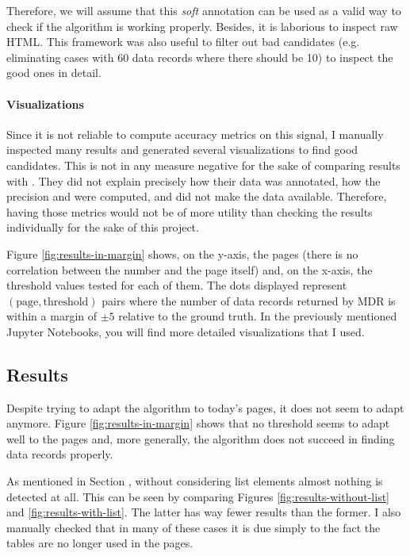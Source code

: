 \documentclass[10pt]{article}
\begin{document}
Therefore, we will assume that this \emph{soft} annotation can be used as a valid way to check if the algorithm is working properly. Besides, it is laborious to inspect raw HTML. This framework was also useful to filter out bad candidates (e.g. eliminating cases with 60 data records where there should be 10) to inspect the good ones in detail.


\paragraph{Visualizations} 

Since it is not reliable to compute accuracy metrics on this signal, I manually inspected many results and generated several visualizations to find good candidates. This is not in any measure negative for the sake of comparing results with \cite{mdr}. They did not explain precisely how their data was annotated, how the precision and were computed, and did not make the data available. Therefore, having those metrics would not be of more utility than checking the results individually for the sake of this project. 

Figure \ref{fig:results-in-margin} shows, on the y-axis, the pages (there is no correlation between the number and the page itself) and, on the x-axis, the threshold values tested for each of them. The dots displayed represent $(\text{page}, \text{threshold})$ pairs where the number of data records returned by MDR is within a margin of $\pm 5$ relative to the ground truth. In the previously mentioned Jupyter Notebooks, you will find more detailed visualizations that I used.



\subsection{Results} \label{txt:results}

Despite trying to adapt the algorithm to today's pages, it does not seem to adapt anymore. Figure \ref{fig:results-in-margin} shows that no threshold seems to adapt well to the pages and, more generally, the algorithm does not succeed in finding data records properly.

As mentioned in Section , without considering list elements almost nothing is detected at all. This can be seen by comparing Figures \ref{fig:results-without-list} and \ref{fig:results-with-list}. The latter has way fewer results than the former. I also manually checked that in many of these cases it is due simply to the fact the tables are no longer used in the pages.
\end{document}
